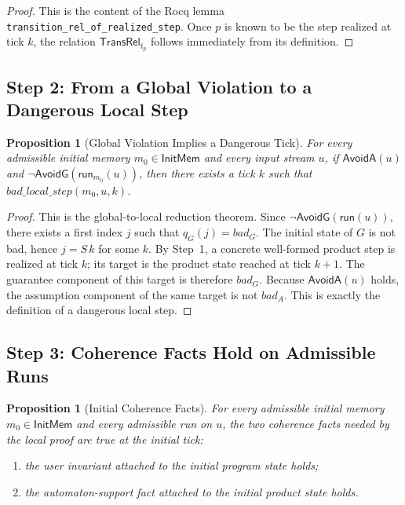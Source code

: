 \documentclass[11pt,a4paper]{article}
\newtheorem{proposition}[definition]{Proposition}
\newcommand{\AvoidA}{\mathsf{AvoidA}}
\newcommand{\AvoidG}{\mathsf{AvoidG}}
\newcommand{\run}{\mathsf{run}}
\begin{document}
\begin{proof}
This is the content of the Rocq lemma
\texttt{transition\_rel\_of\_realized\_step}. Once \(p\) is known to be the
step realized at tick \(k\), the relation \(\mathsf{TransRel}_{t_p}\) follows
immediately from its definition.
\end{proof}

\subsection{Step 2: From a Global Violation to a Dangerous Local Step}

\begin{proposition}[Global Violation Implies a Dangerous Tick]
For every admissible initial memory \(m_0 \in \mathsf{InitMem}\) and every input stream
\(u\), if \(\AvoidA(u)\) and \(\neg \AvoidG(\run_{m_0}(u))\), then there exists
a tick \(k\) such that \(bad\_local\_step(m_0,u,k)\).
\end{proposition}

\begin{proof}
This is the global-to-local reduction theorem. Since
\(\neg \AvoidG(\run(u))\), there exists a first index \(j\) such that
\(q_G(j)=bad_G\). The initial state of \(G\) is not bad, hence \(j=S\,k\) for
some \(k\). By Step~1, a concrete well-formed product step is realized at tick
\(k\); its target is the product state reached at tick \(k+1\). The guarantee
component of this target is therefore \(bad_G\). Because \(\AvoidA(u)\) holds,
the assumption component of the same target is not \(bad_A\). This is exactly
the definition of a dangerous local step.
\end{proof}

\subsection{Step 3: Coherence Facts Hold on Admissible Runs}

\begin{proposition}[Initial Coherence Facts]
For every admissible initial memory \(m_0 \in \mathsf{InitMem}\) and every admissible
run on \(u\), the two coherence facts needed by the local proof are true at the
initial tick:
\begin{enumerate}[leftmargin=1.4em]
\item the user invariant attached to the initial program state holds;
\item the automaton-support fact attached to the initial product state holds.
\end{enumerate}
\end{proposition}
\end{document}
